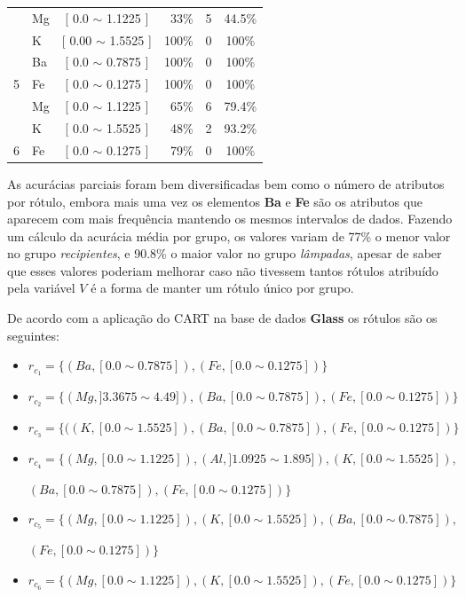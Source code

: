\begin{table}[!h]
{\begin{tabular}{llcrcc}
                                            & Mg    & [ 0.0 $\sim$  1.1225 ]     & 33\%  & 5  & 44.5\% \\ 
                                            & K     & [ 0.00 $\sim$ 1.5525 ]     & 100\%  & 0 & 100\% \\ 
                                            & Ba     & [ 0.0 $\sim$  0.7875 ]    & 100\%  & 0 & 100\% \\  
\multirow{-4}{*}{5}                         & Fe    & [ 0.0 $\sim$  0.1275 ]     & 100\%  & 0 & 100\% \\  \hline
                                            & Mg    & [ 0.0 $\sim$  1.1225 ]     & 65\%  & 6  & 79.4\% \\ 
                                            & K     & [ 0.0 $\sim$ 1.5525 ]      & 48\%  & 2  & 93.2\% \\ 
\multirow{-3}{*}{6}                         & Fe    & [ 0.0 $\sim$  0.1275 ]     & 79\%  & 0  & 100\% \\  \hline

\end{tabular}
}
\end{table}

As acurácias parciais foram bem diversificadas bem como o número de atributos por rótulo, embora mais uma vez os elementos \textbf{Ba} e \textbf{Fe} são os atributos que aparecem com mais frequência mantendo os mesmos intervalos de dados. Fazendo um cálculo da acurácia média por grupo, os valores variam de 77\% o menor valor no grupo \textit{recipientes}, e 90.8\% o maior valor no grupo \textit{lâmpadas}, apesar de saber que esses valores poderiam melhorar caso não tivessem tantos rótulos atribuído pela variável ${V}$ é a forma de manter um rótulo único por grupo.



De acordo com a aplicação do CART na base de dados \textbf{Glass} os rótulos são os seguintes:
\begin{itemize}[noitemsep]
 \item ${r_{c_1}=\{ (Ba,[ 0.0 \sim 0.7875 ] ),(Fe,[ 0.0 \sim 0.1275 ] ) \} }$  
 \item ${r_{c_2}=\{ (Mg,] 3.3675 \sim  4.49 ] ),(Ba,[ 0.0 \sim 0.7875 ] ),(Fe,[ 0.0 \sim 0.1275 ] ) \} }$
 \item ${r_{c_3}=\{ ((K,[ 0.0 \sim 1.5525 ] ),(Ba,[ 0.0 \sim 0.7875 ] ),(Fe,[ 0.0 \sim 0.1275 ] )  \} }$  
 \item ${r_{c_4}=\{ (Mg,[ 0.0 \sim  1.1225 ] ),(Al,] 1.0925 \sim 1.895 ] ), (K,[ 0.0 \sim 1.5525 ] ),}$

 ${ (Ba,[ 0.0 \sim 0.7875 ] ),(Fe,[ 0.0 \sim 0.1275 ] ) \} }$
 \item ${r_{c_5}=\{ (Mg,[ 0.0 \sim  1.1225 ] ), (K,[ 0.0 \sim 1.5525 ]  ),(Ba,[ 0.0 \sim 0.7875 ] ), }$
 
 ${ (Fe,[ 0.0 \sim 0.1275 ] ) \} }$
 \item ${r_{c_6}=\{ (Mg,[ 0.0 \sim  1.1225  ] ),  (K,[ 0.0 \sim 1.5525] ),(Fe,[ 0.0 \sim 0.1275 ] ) \} }$
\end{itemize}



